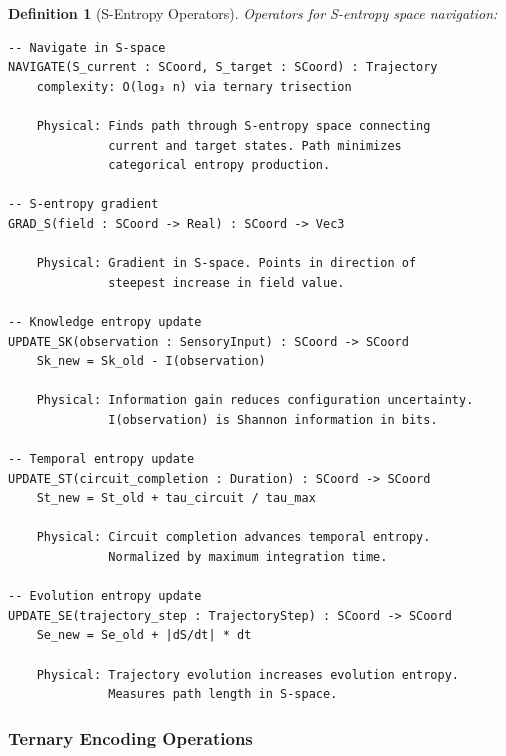 \documentclass[aps,prd,twocolumn,superscriptaddress,floatfix,nofootinbib]{revtex4-2}
\newtheorem{definition}[theorem]{Definition}
\theoremstyle{remark}
\begin{document}
\begin{definition}[S-Entropy Operators]
\label{def:s_entropy_ops}
Operators for S-entropy space navigation:
\begin{verbatim}
-- Navigate in S-space
NAVIGATE(S_current : SCoord, S_target : SCoord) : Trajectory
    complexity: O(log₃ n) via ternary trisection
    
    Physical: Finds path through S-entropy space connecting
              current and target states. Path minimizes
              categorical entropy production.

-- S-entropy gradient
GRAD_S(field : SCoord -> Real) : SCoord -> Vec3
    
    Physical: Gradient in S-space. Points in direction of
              steepest increase in field value.

-- Knowledge entropy update
UPDATE_SK(observation : SensoryInput) : SCoord -> SCoord
    Sk_new = Sk_old - I(observation)
    
    Physical: Information gain reduces configuration uncertainty.
              I(observation) is Shannon information in bits.

-- Temporal entropy update
UPDATE_ST(circuit_completion : Duration) : SCoord -> SCoord
    St_new = St_old + tau_circuit / tau_max
    
    Physical: Circuit completion advances temporal entropy.
              Normalized by maximum integration time.

-- Evolution entropy update
UPDATE_SE(trajectory_step : TrajectoryStep) : SCoord -> SCoord
    Se_new = Se_old + |dS/dt| * dt
    
    Physical: Trajectory evolution increases evolution entropy.
              Measures path length in S-space.
\end{verbatim}
\end{definition}

\subsubsection{Ternary Encoding Operations}
\end{document}
